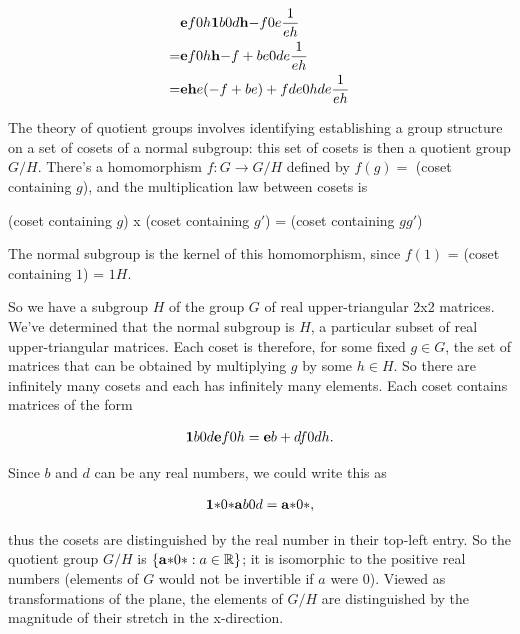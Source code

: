 \begin{align*}
&\mathbf{e}{f}
     {0}{h} \mathbf{1}{b}
                {0}{d} \mathbf{h}{-f}
                           {0}{e} \frac{1}{eh} \\
= &\mathbf{e}{f}
       {0}{h} \mathbf{h}{-f + be}
                  {0}{de     } \frac{1}{eh} \\
= &\mathbf{eh}{e(-f + be) + fde}
       {0}{hde} \frac{1}{eh}
\end{align*}


The theory of quotient groups involves identifying establishing a group
structure on a set of cosets of a normal subgroup: this set of cosets is then a
quotient group $G/H$. There's a homomorphism $f:G \rightarrow G/H$ defined by
$f(g) =$ (coset containing $g$), and the multiplication law between cosets is

(coset containing $g$) x (coset containing $g'$) = (coset containing $gg'$)

The normal subgroup is the kernel of this homomorphism, since $f(1)$ = (coset
containing $1$) = $1H$.

So we have a subgroup $H$ of the group $G$ of real upper-triangular 2x2
matrices.  We've determined that the normal subgroup is $H$, a particular
subset of real upper-triangular matrices. Each coset is therefore, for some
fixed $g \in G$, the set of matrices that can be obtained by multiplying $g$ by
some $h \in H$. So there are infinitely many cosets and each has infinitely
many elements. Each coset contains matrices of the form

\begin{align*}
\mathbf{1}{b}
    {0}{d} \mathbf{e}{f}
               {0}{h} = \mathbf{e}{b + df}
                            {0}{dh    }.
\end{align*}

Since $b$ and $d$ can be any real numbers, we could write this as

\begin{align*}
\mathbf{1}{*}
    {0}{*} \mathbf{a}{b}
               {0}{d} = \mathbf{a}{*}
                            {0}{*},
\end{align*}

thus the cosets are distinguished by the real number in their top-left
entry. So the quotient group $G/H$ is $\left\{\tiny{\mathbf{a}{*}{0}{*}}: a \in
\mathbb{R}\right\}$; it is isomorphic to the positive real numbers (elements of $G$
would not be invertible if $a$ were $0$). Viewed as transformations of the
plane, the elements of $G/H$ are distinguished by the magnitude of their
stretch in the x-direction.

